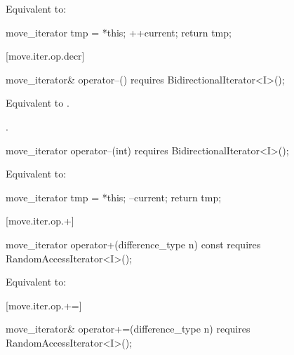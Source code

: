 \begin{itemdescr}
\pnum
\effects Equivalent to:
\begin{codeblock}
move_iterator tmp = *this;
++current;
return tmp;
\end{codeblock}
\end{itemdescr}

[move.iter.op.decr]{}

%
%
\begin{itemdecl}
move_iterator& operator--()
  requires BidirectionalIterator<I>();
\end{itemdecl}

\begin{itemdescr}
\pnum
\effects Equivalent to .

\pnum
\returns {}.
\end{itemdescr}

%
%
\begin{itemdecl}
move_iterator operator--(int)
  requires BidirectionalIterator<I>();
\end{itemdecl}

\begin{itemdescr}
\pnum
\effects Equivalent to:
\begin{codeblock}
move_iterator tmp = *this;
--current;
return tmp;
\end{codeblock}
\end{itemdescr}

[move.iter.op.+]{}

%
%
\begin{itemdecl}
move_iterator operator+(difference_type n) const
  requires RandomAccessIterator<I>();
\end{itemdecl}

\begin{itemdescr}
\pnum
\effects Equivalent to:
\end{itemdescr}

[move.iter.op.+=]{}

%
%
\begin{itemdecl}
move_iterator& operator+=(difference_type n)
  requires RandomAccessIterator<I>();
\end{itemdecl}

